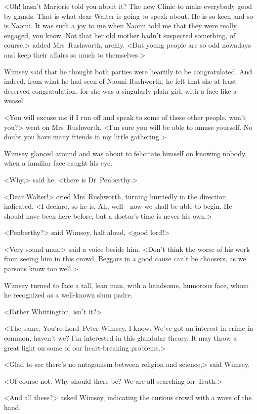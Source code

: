 <Oh! hasn't Marjorie told you about it? The new Clinic to make everybody good by glands. That is what dear Walter is going to speak about. He is so keen and so is Naomi. It was such a joy to me when Naomi told me that they were really engaged, you know. Not that her old mother hadn't suspected something, of course,> added Mrs~Rushworth, archly. <But young people are so odd nowadays and keep their affairs so much to themselves.>

Wimsey said that he thought both parties were heartily to be congratulated. And indeed, from what he had seen of Naomi Rushworth, he felt that she at least deserved congratulation, for she was a singularly plain girl, with a face like a weasel.

<You will excuse me if I run off and speak to some of these other people, won't you?> went on Mrs~Rushworth. <I'm sure you will be able to amuse yourself. No doubt you have many friends in my little gathering.>

Wimsey glanced around and was about to felicitate himself on knowing nobody, when a familiar face caught his eye.

<Why,> said he, <there is Dr~Penberthy.>

<Dear Walter!> cried Mrs~Rushworth, turning hurriedly in the direction indicated. <I declare, so he is. Ah, well—now we shall be able to begin. He should have been here before, but a doctor's time is never his own.>

<Penberthy?> said Wimsey, half aloud, <good lord!>

<Very sound man,> said a voice beside him. <Don't think the worse of his work from seeing him in this crowd. Beggars in a good cause can't be choosers, as we parsons know too well.>

Wimsey turned to face a tall, lean man, with a handsome, humorous face, whom he recognized as a well-known slum padre.

<Father Whittington, isn't it?>

<The same. You're Lord~Peter Wimsey, I know. We've got an interest in crime in common, haven't we? I'm interested in this glandular theory. It may throw a great light on some of our heart-breaking problems.>

<Glad to see there's no antagonism between religion and science,> said Wimsey.

<Of course not. Why should there be? We are all searching for Truth.>

<And all these?> asked Wimsey, indicating the curious crowd with a wave of the hand.

